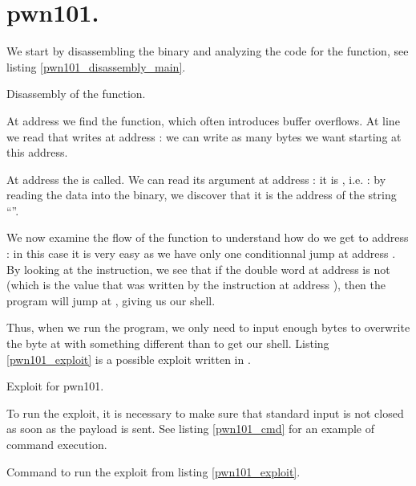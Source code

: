 \section{pwn101.}
\par We start by disassembling the binary and analyzing the code for the  function, see listing \ref{pwn101_disassembly_main}.
\begin{listing}
	
	\caption{Disassembly of the  function.}
	\label{pwn101_disassembly_main}
\end{listing}
\par At address  we find the  function, which often introduces buffer overflows. At line  we read that  writes at address : we can write as many bytes we want starting at this address.
\par At address  the  is called. We can read its argument at address : it is , i.e. : by reading the data into the binary, we discover that it is the address of the string ``''.
\par We now examine the flow of the  function to understand how do we get to address :  in this case it is very easy as we have only one conditionnal jump at address . By looking at the  instruction, we see that if the double word at address  is not  (which is the value that was written by the instruction at address ), then the program will jump at , giving us our shell.
\par Thus, when we run the program, we only need to input enough bytes to overwrite the byte at  with something different than  to get our shell. Listing \ref{pwn101_exploit} is a possible exploit written in .
\begin{listing}
	\caption{Exploit for pwn101.}
	\label{pwn101_exploit}
\end{listing}
\par To run the exploit, it is necessary to make sure that standard input is not closed as soon as the payload is sent. See listing \ref{pwn101_cmd} for an example of command execution.
\begin{listing}
	\caption{Command to run the exploit from listing \ref{pwn101_exploit}.}
	\label{pwn101_cmd}
\end{listing}
